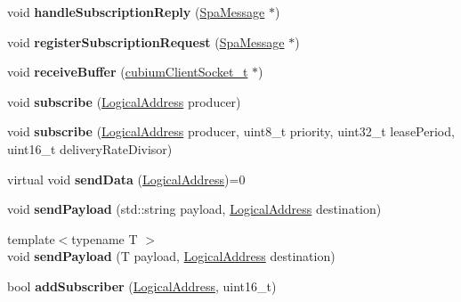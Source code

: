 \begin{DoxyCompactItemize}
void {\bfseries handle\+Subscription\+Reply} (\hyperlink{structSpaMessage}{Spa\+Message} $\ast$)
\item 
\mbox{\label{classComponent_aaa5c27b493d39887885adb3dd21e2224}} 
void {\bfseries register\+Subscription\+Request} (\hyperlink{structSpaMessage}{Spa\+Message} $\ast$)
\item 
\mbox{\label{classComponent_a9f81ad79e0243e6e52ae04b26e6657ab}} 
void {\bfseries receive\+Buffer} (\hyperlink{structcubiumClientSocket__t}{cubium\+Client\+Socket\+\_\+t} $\ast$)
\item 
\mbox{\label{classComponent_a55c74b1c2dcde114cb329ae43a4cd04a}} 
void {\bfseries subscribe} (\hyperlink{structLogicalAddress}{Logical\+Address} producer)
\item 
\mbox{\label{classComponent_abae1852e26a7bee748898ea8ef6f4fb9}} 
void {\bfseries subscribe} (\hyperlink{structLogicalAddress}{Logical\+Address} producer, uint8\+\_\+t priority, uint32\+\_\+t lease\+Period, uint16\+\_\+t delivery\+Rate\+Divisor)
\item 
\mbox{\label{classComponent_a492a20dc97b9563d80443dda2f1057ec}} 
virtual void {\bfseries send\+Data} (\hyperlink{structLogicalAddress}{Logical\+Address})=0
\item 
\mbox{\label{classComponent_afc9525526fdc44c64873abf80357c3be}} 
void {\bfseries send\+Payload} (std\+::string payload, \hyperlink{structLogicalAddress}{Logical\+Address} destination)
\item 
\mbox{\label{classComponent_af7ee2839809098ffd50029375aa3e5a7}} 
{\footnotesize template$<$typename T $>$ }\\void {\bfseries send\+Payload} (T payload, \hyperlink{structLogicalAddress}{Logical\+Address} destination)
\item 
\mbox{\label{classComponent_a54c0c489eec4e4f6b23655a734fc00d4}} 
bool {\bfseries add\+Subscriber} (\hyperlink{structLogicalAddress}{Logical\+Address}, uint16\+\_\+t)
\end{DoxyCompactItemize}
